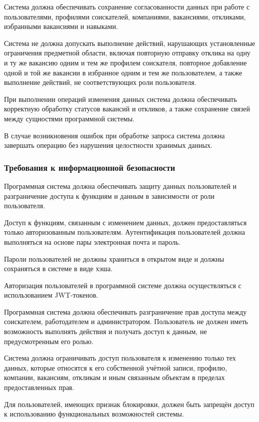 Система должна обеспечивать сохранение согласованности данных при работе с пользователями, профилями соискателей, компаниями, вакансиями, откликами, избранными вакансиями и навыками.

Система не должна допускать выполнение действий, нарушающих установленные ограничения предметной области, включая повторную отправку отклика на одну и ту же вакансию одним и тем же профилем соискателя, повторное добавление одной и той же вакансии в избранное одним и тем же пользователем, а также выполнение действий, не соответствующих роли пользователя.

При выполнении операций изменения данных система должна обеспечивать корректную обработку статусов вакансий и откликов, а также сохранение связей между сущностями программной системы.

В случае возникновения ошибок при обработке запроса система должна завершать операцию без нарушения целостности хранимых данных.

\subsubsection{Требования к информационной безопасности}

Программная система должна обеспечивать защиту данных пользователей и разграничение доступа к функциям и данным в зависимости от роли пользователя.

Доступ к функциям, связанным с изменением данных, должен предоставляться только авторизованным пользователям. Аутентификация пользователей должна выполняться на основе пары электронная почта и пароль.

Пароли пользователей не должны храниться в открытом виде и должны сохраняться в системе в виде хэша.

Авторизация пользователей в программной системе должна осуществляться с использованием JWT-токенов.

Программная система должна обеспечивать разграничение прав доступа между соискателем, работодателем и администратором. Пользователь не должен иметь возможность выполнять действия и получать доступ к данным, не предусмотренным его ролью.

Система должна ограничивать доступ пользователя к изменению только тех данных, которые относятся к его собственной учётной записи, профилю, компании, вакансиям, откликам и иным связанным объектам в пределах предоставленных прав.

Для пользователей, имеющих признак блокировки, должен быть запрещён доступ к использованию функциональных возможностей системы.


